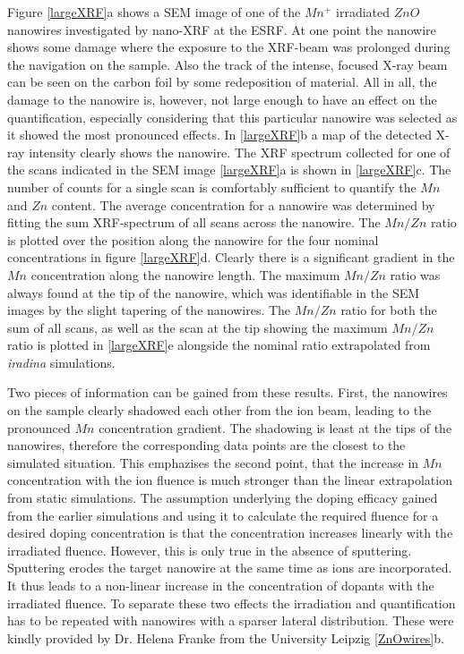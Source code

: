 Figure \ref{largeXRF}a shows a SEM image of one of the $Mn^+$ irradiated $ZnO$ nanowires investigated by nano-XRF at the ESRF. At one point the nanowire shows some damage where the exposure to the XRF-beam was prolonged during the navigation on the sample. Also the track of the intense, focused X-ray beam can be seen on the carbon foil by some redeposition of material. All in all, the damage to the nanowire is, however, not large enough to have an effect on the quantification, especially considering that this particular nanowire was selected as it showed the most pronounced effects. In \ref{largeXRF}b a map of the detected X-ray intensity clearly shows the nanowire. The XRF spectrum collected for one of the scans indicated in the SEM image \ref{largeXRF}a is shown in \ref{largeXRF}c. The number of counts for a single scan is comfortably sufficient to quantify the $Mn$ and $Zn$ content. The average concentration for a nanowire was determined by fitting the sum XRF-spectrum of all scans across the nanowire. The $Mn/Zn$ ratio is plotted over the position along the nanowire for the four nominal concentrations in figure \ref{largeXRF}d. Clearly there is a significant gradient in the $Mn$ concentration along the nanowire length. The maximum $Mn/Zn$ ratio was always found at the tip of the nanowire, which was identifiable in the SEM images by the slight tapering of the nanowires. The $Mn/Zn$ ratio for both the sum of all scans, as well as the scan at the tip showing the maximum $Mn/Zn$ ratio is plotted in \ref{largeXRF}e alongside the nominal ratio extrapolated from \emph{iradina} simulations.
  
Two pieces of information can be gained from these results. First, the nanowires on the sample clearly shadowed each other from the ion beam, leading to the pronounced $Mn$ concentration gradient. The shadowing is least at the tips of the nanowires, therefore the corresponding data points are the closest to the simulated situation. This emphazises the second point, that the increase in $Mn$ concentration with the ion fluence is much stronger than the linear extrapolation from static simulations. The assumption underlying the doping efficacy gained from the earlier simulations and using it to calculate the required fluence for a desired doping concentration is that the concentration increases linearly with the irradiated fluence. However, this is only true in the absence of sputtering. Sputtering erodes the target nanowire at the same time as ions are incorporated. It thus leads to a non-linear increase in the concentration of dopants with the irradiated fluence. To separate these two effects the irradiation and quantification has to be repeated with nanowires with a sparser lateral distribution. These were kindly provided by Dr. Helena Franke from the University Leipzig \ref{ZnOwires}b.



